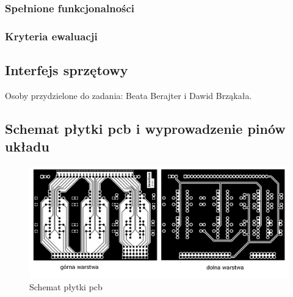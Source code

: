 \documentclass{article}
\begin{document}
\subsubsection{Spełnione funkcjonalności}

\subsubsection{Kryteria ewaluacji}


\subsection{Interfejs sprzętowy}

Osoby przydzielone do zadania: Beata Berajter i Dawid Brząkała. \\


\subsection{Schemat płytki pcb i wyprowadzenie pinów układu}

\begin{figure}[h!]
    \centering
    \includegraphics[scale=0.6]{pcb.png}
    \caption{Schemat płytki pcb}
    \label{rys:pcb}
\end{figure}
\end{document}

